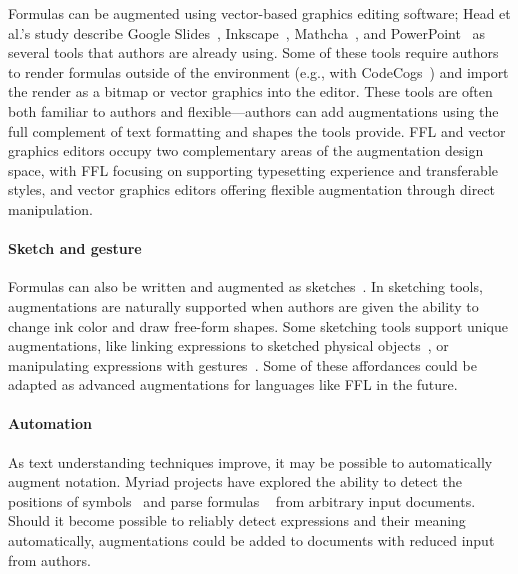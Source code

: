 Formulas can be augmented using vector-based graphics editing software; Head et al.'s study describe Google Slides~\cite{tool:googleslides}, Inkscape~\cite{tool:inkscape}, Mathcha~\cite{tool:mathcha}, and PowerPoint~\cite{tool:powerpoint} as several tools that authors are already using. Some of these tools require authors to render formulas outside of the environment (e.g., with CodeCogs~\cite{tool:codecogs}) and import the render as a bitmap or vector graphics into the editor. These tools are often both familiar to authors and flexible---authors can add augmentations using the full complement of text formatting and shapes the tools provide.  FFL and vector graphics editors occupy two complementary areas of the augmentation design space, with FFL focusing on supporting typesetting experience and transferable styles, and vector graphics editors offering flexible augmentation through direct manipulation.


\paragraph{Sketch and gesture}
Formulas can also be written and augmented as sketches~\cite{ref:laviola2006mathpad2,ref:zeleznik2010hands,ref:leitner2010nice,ref:saquib2021constructing}. In sketching tools, augmentations are naturally supported when authors are given the ability to change ink color and draw free-form shapes. Some sketching tools support unique augmentations, like linking expressions to sketched physical objects~\cite{ref:laviola2006mathpad2,ref:saquib2021constructing}, or manipulating expressions with gestures~\cite{ref:zeleznik2010hands,ref:weitnauer2016graspable,ref:mendes2014structure}. Some of these affordances could be adapted as advanced augmentations for languages like FFL in the future.

\paragraph{Automation}
As text understanding techniques improve, it may be possible to automatically augment notation. Myriad projects have explored the ability to detect the positions of symbols~\cite{ref:head2021augmenting} and parse formulas ~\cite{ref:anthony2005evaluation,ref:ma2021latexify} from arbitrary input documents. Should it become possible to reliably detect expressions and their meaning automatically, augmentations could be added to documents with reduced input from authors.

